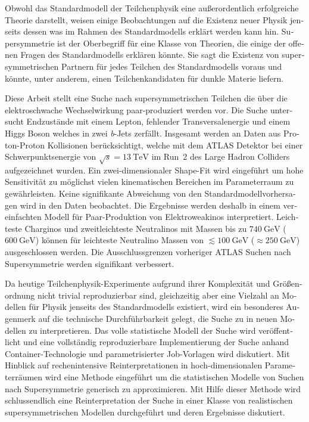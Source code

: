 \begin{otherlanguage}{ngerman} 
\begin{zusammenfassung}

Obwohl das Standardmodell der Teilchenphysik eine außerordentlich erfolgreiche Theorie darstellt, weisen einige Beobachtungen auf die Existenz neuer Physik jenseits dessen was im Rahmen des Standardmodells erklärt werden kann hin. Supersymmetrie ist der Oberbegriff für eine Klasse von Theorien, die einige der offenen Fragen des Standardmodells erklären könnte. Sie sagt die Existenz von supersymmetrischen Partnern für jedes Teilchen des Standardmodells voraus und könnte, unter anderem, einen Teilchenkandidaten für dunkle Materie liefern. 

Diese Arbeit stellt eine Suche nach supersymmetrischen Teilchen die über die elektroschwache Wechselwirkung paar-produziert werden vor. Die Suche untersucht Endzustände mit einem Lepton, fehlender Transversalenergie und einem Higgs Boson welches in zwei \textit{b}-Jets zerfällt. Insgesamt werden \onethirtynineifb an Daten aus Proton-Proton Kollisionen berücksichtigt, welche mit dem ATLAS Detektor bei einer Schwerpunktsenergie von $\sqrt{s}=\SI{13}{\TeV}$ im Run~2 des Large Hadron Colliders aufgezeichnet wurden. Ein zwei-dimensionaler Shape-Fit wird eingeführt um hohe Sensitivität zu möglichst vielen kinematischen Bereichen im Parameterraum zu gewährleisten. Keine signifikante Abweichung von den Standardmodellvorhersagen wird in den Daten beobachtet. Die Ergebnisse werden deshalb in einem vereinfachten Modell für Paar-Produktion von Elektroweakinos interpretiert. Leichteste Charginos und zweitleichteste Neutralinos mit Massen bis zu $\SI{740}{\GeV}$ ($\SI{600}{\GeV}$) können für leichteste Neutralino Massen von $\lesssim \SI{100}{\GeV}$ ($\approx\SI{250}{\GeV}$) ausgeschlossen werden. Die Ausschlussgrenzen vorheriger ATLAS Suchen nach Supersymmetrie werden signifikant verbessert.

Da heutige Teilchenphysik-Experimente aufgrund ihrer Komplexität und Größenordnung nicht trivial reproduzierbar sind, gleichzeitig aber eine Vielzahl an Modellen für Physik jenseits des Standardmodells existiert, wird ein besonderes Augenmerk auf die technische Durchführbarkeit gelegt, die Suche zu in neuen Modellen zu interpretieren. Das volle statistische Modell der Suche wird veröffentlicht und eine vollständig reproduzierbare Implementierung der Suche anhand Container-Technologie und parametrisierter Job-Vorlagen wird diskutiert. Mit Hinblick auf rechenintensive Reinterpretationen in hoch-dimensionalen Parameterräumen wird eine Methode eingeführt um die statistischen Modelle von Suchen nach Supersymmetrie generisch zu approximieren. Mit Hilfe dieser Methode wird schlussendlich eine Reinterpretation der Suche in einer Klasse von realistischen supersymmetrischen Modellen durchgeführt und deren Ergebnisse diskutiert. 





\end{zusammenfassung}
\end{otherlanguage}  
